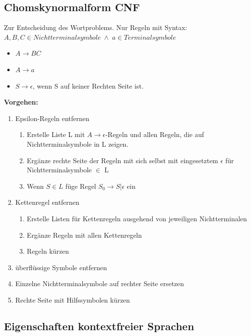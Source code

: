 \documentclass[12pt,a4paper]{article}
\begin{document}
	\subsection{Chomskynormalform CNF}
	Zur Entscheidung des Wortproblems. Nur Regeln mit Syntax:\\
	$A,B,C \in Nichtterminalsymbole \; \wedge \; a \in Terminalsymbole$
	\begin{itemize}
		\item $A \rightarrow BC$ 
		\item $A \rightarrow a$
		\item $S \rightarrow \epsilon$, wenn S auf keiner Rechten Seite ist.
	\end{itemize}
	\textbf{Vorgehen:}
	\begin{enumerate}
		\item Epsilon-Regeln entfernen
		\begin{enumerate}
			\item Erstelle Liste L mit $A\rightarrow \epsilon$-Regeln und allen Regeln, die auf Nichtterminalsymbole in L zeigen.
			\item Ergänze rechte Seite der Regeln mit sich selbst mit eingesetztem $\epsilon$ für Nichtterminalsymbole $\in$ L
			\item Wenn $S \in L$ füge Regel $S_0 \rightarrow S | \epsilon$ ein
		\end{enumerate}
		\item Kettenregel entfernen
		\begin{enumerate}
			\item Erstelle Listen für Kettenregeln ausgehend von jeweiligen Nichtterminalen
			\item Ergänze Regeln mit allen Kettenregeln
			\item Regeln kürzen
		\end{enumerate}
		\item überflüssige Symbole entfernen
		\item Einzelne Nichtterminalsymbole auf rechter Seite ersetzen 
		\item Rechte Seite mit Hilfssymbolen kürzen
	\end{enumerate}
	
	\subsection{Eigenschaften kontextfreier Sprachen}
\end{document}
